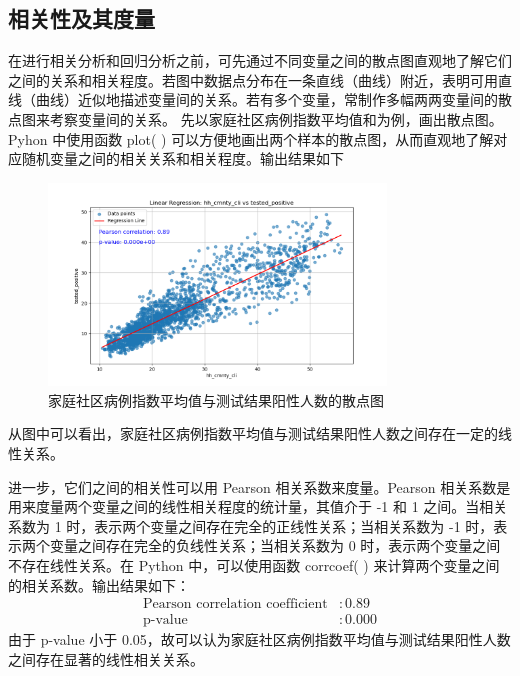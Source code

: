 \documentclass[UTF8,ctexart,a4paper,11pt,openany]{article}
\theoremstyle{definition}
\begin{document}
\subsection{相关性及其度量}\par
在进行相关分析和回归分析之前，可先通过不同变量之间的散点图直观地了解它们之间的关系和相关程度。若图中数据点分布在一条直线（曲线）附近，表明可用直线（曲线）近似地描述变量间的关系。若有多个变量，常制作多幅两两变量间的散点图来考察变量间的关系。
先以家庭社区病例指数平均值和为例，画出散点图。Pyhon 中使用函数 plot( ) 可以方便地画出两个样本的散点图，从而直观地了解对应随机变量之间的相关关系和相关程度。输出结果如下
\begin{figure}[H]
\centering
\includegraphics[width=0.8\textwidth]{Figure_6.png}
\caption{家庭社区病例指数平均值与测试结果阳性人数的散点图}
\label{fig:scatter}
\end{figure}
从图中可以看出，家庭社区病例指数平均值与测试结果阳性人数之间存在一定的线性关系。\par
进一步，它们之间的相关性可以用 Pearson 相关系数来度量。Pearson 相关系数是用来度量两个变量之间的线性相关程度的统计量，其值介于 -1 和 1 之间。当相关系数为 1 时，表示两个变量之间存在完全的正线性关系；当相关系数为 -1 时，表示两个变量之间存在完全的负线性关系；当相关系数为 0 时，表示两个变量之间不存在线性关系。在 Python 中，可以使用函数 corrcoef( ) 来计算两个变量之间的相关系数。输出结果如下：
\begin{align*}
    \text{Pearson correlation coefficient} & : 0.89 \\
    \text{p-value} & : 0.000
\end{align*}
由于 p-value 小于 0.05，故可以认为家庭社区病例指数平均值与测试结果阳性人数之间存在显著的线性相关关系。\par
\end{document}
